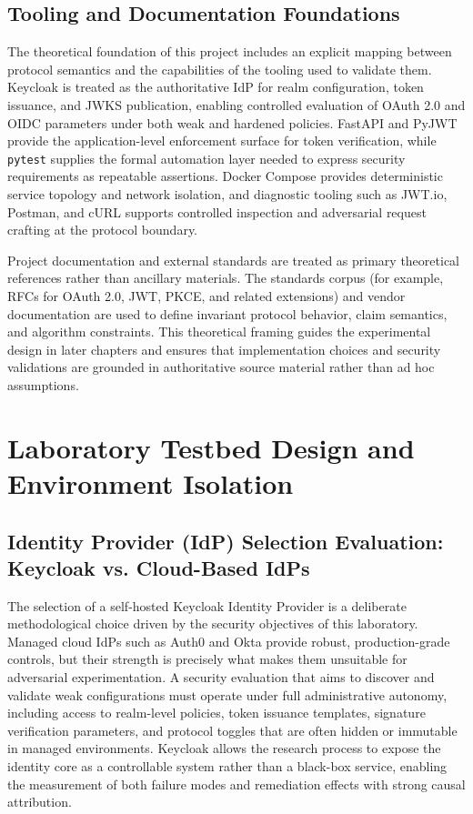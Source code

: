 \documentclass[11pt,a4paper]{report}
\begin{document}
\section{Tooling and Documentation Foundations}
\label{sec:tooling-foundations}
The theoretical foundation of this project includes an explicit mapping between protocol semantics and the capabilities of the tooling used to validate them. Keycloak is treated as the authoritative IdP for realm configuration, token issuance, and JWKS publication, enabling controlled evaluation of OAuth 2.0 and OIDC parameters under both weak and hardened policies. FastAPI and PyJWT provide the application-level enforcement surface for token verification, while \texttt{pytest} supplies the formal automation layer needed to express security requirements as repeatable assertions. Docker Compose provides deterministic service topology and network isolation, and diagnostic tooling such as JWT.io, Postman, and cURL supports controlled inspection and adversarial request crafting at the protocol boundary.

Project documentation and external standards are treated as primary theoretical references rather than ancillary materials. The standards corpus (for example, RFCs for OAuth 2.0, JWT, PKCE, and related extensions) and vendor documentation are used to define invariant protocol behavior, claim semantics, and algorithm constraints. This theoretical framing guides the experimental design in later chapters and ensures that implementation choices and security validations are grounded in authoritative source material rather than ad hoc assumptions.

\chapter{Laboratory Testbed Design and Environment Isolation}
\label{chap:testbed}

\section{Identity Provider (IdP) Selection Evaluation: Keycloak vs. Cloud-Based IdPs}
\label{sec:idp-selection}
The selection of a self-hosted Keycloak Identity Provider is a deliberate methodological choice driven by the security objectives of this laboratory. Managed cloud IdPs such as Auth0 and Okta provide robust, production-grade controls, but their strength is precisely what makes them unsuitable for adversarial experimentation. A security evaluation that aims to discover and validate weak configurations must operate under full administrative autonomy, including access to realm-level policies, token issuance templates, signature verification parameters, and protocol toggles that are often hidden or immutable in managed environments. Keycloak allows the research process to expose the identity core as a controllable system rather than a black-box service, enabling the measurement of both failure modes and remediation effects with strong causal attribution.
\end{document}
